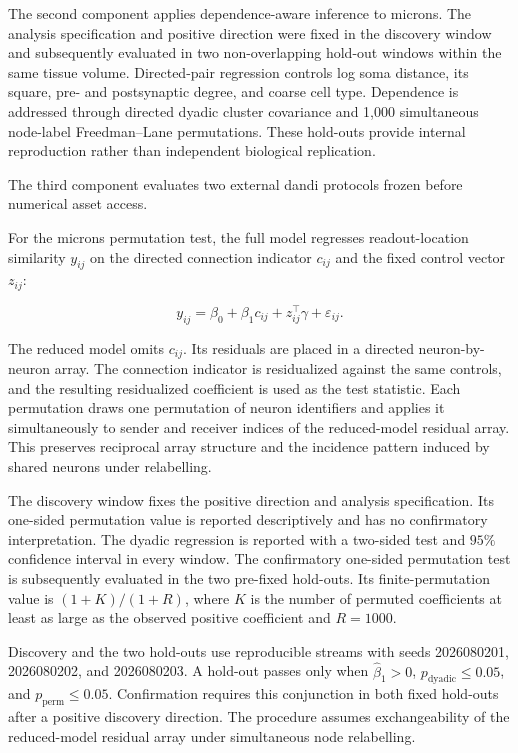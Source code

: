 \documentclass[11pt,a4paper]{article}
\begin{document}
The second component applies dependence-aware inference to \ac{microns}. The analysis specification and positive direction were fixed in the discovery window and subsequently evaluated in two non-overlapping hold-out windows within the same tissue volume. Directed-pair regression controls log soma
distance, its square, pre- and postsynaptic degree, and coarse cell type. Dependence is addressed through directed dyadic cluster covariance and 1,000 simultaneous node-label Freedman--Lane permutations. These hold-outs provide internal reproduction rather than independent biological replication.

The third component evaluates two external \ac{dandi} protocols frozen before numerical asset access.

For the \ac{microns} permutation test, the full model regresses readout-location similarity $y_{ij}$ on the directed connection indicator $c_{ij}$ and the fixed control vector $z_{ij}$:

\begin{equation}
y_{ij}=
\beta_0+\beta_1c_{ij}+z_{ij}^{\top}\gamma+\varepsilon_{ij}.
\label{eq:microns-full-model}
\end{equation}

The reduced model omits $c_{ij}$. Its residuals are placed in a directed neuron-by-neuron array. The connection indicator is residualized against the same controls, and the resulting residualized coefficient is used as the test statistic. Each permutation draws one permutation of neuron identifiers and applies it simultaneously to sender and receiver indices of the reduced-model residual array. This preserves reciprocal array structure and the incidence pattern induced by shared neurons under relabelling.

The discovery window fixes the positive direction and analysis specification. Its one-sided permutation value is reported descriptively and has no confirmatory interpretation. The dyadic regression is reported with a two-sided test and $95\%$ confidence interval in every window. The
confirmatory one-sided permutation test is subsequently evaluated in the two pre-fixed hold-outs. Its finite-permutation value is $(1+K)/(1+R)$, where $K$ is the number of permuted coefficients at least as large as the observed positive coefficient and $R=1000$.

Discovery and the two hold-outs use reproducible streams with seeds 2026080201, 2026080202, and 2026080203. A hold-out passes only when $\widehat{\beta}_1>0$, $p_{\mathrm{dyadic}}\leq0.05$, and
$p_{\mathrm{perm}}\leq0.05$. Confirmation requires this conjunction in both fixed hold-outs after a positive discovery direction. The procedure assumes exchangeability of the reduced-model residual array under simultaneous node relabelling.
\end{document}
